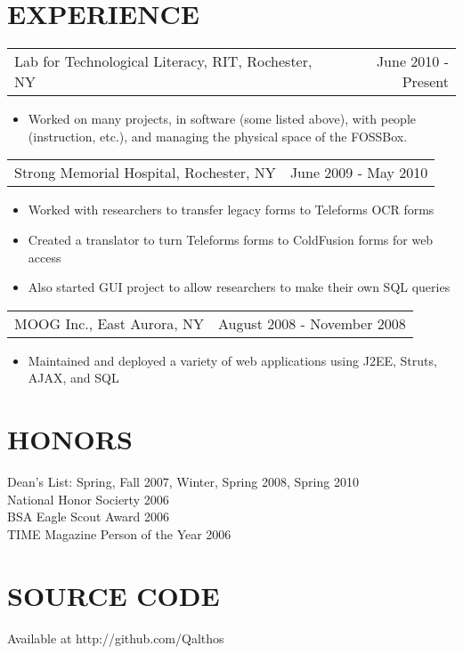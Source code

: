 \documentclass[line]{res}
\begin{document}
\begin{resume}
\section{EXPERIENCE}
    \begin{tabular}{p{3.5in} r} %
        Lab for Technological Literacy, RIT, Rochester, NY & June 2010 - Present
    \end{tabular}
        \begin{itemize} %
            \item[] Worked on many projects, in software (some listed above),
                with people (instruction, etc.), and managing the physical
                space of the FOSSBox.
        \end{itemize}
    \begin{tabular}{p{3.5in} r}
        Strong Memorial Hospital, Rochester, NY & June 2009 - May 2010
    \end{tabular}
    \begin{itemize}
        \item[] Worked with researchers to transfer legacy forms to Teleforms OCR forms
        \item[] Created a translator to turn Teleforms forms to ColdFusion forms for web access
        \item[] Also started GUI project to allow researchers to make their own SQL queries
    \end{itemize}
    \begin{tabular}{p{3.5in} r} %
        MOOG Inc., East Aurora, NY & August 2008 - November 2008
    \end{tabular}
    \begin{itemize}
        \item[] Maintained and deployed a variety of web applications using J2EE, Struts, AJAX, and SQL
    \end{itemize}

\section{HONORS} Dean's List: Spring, Fall 2007, Winter, Spring 2008, Spring 2010 \\
                 National Honor Socierty 2006 \\
                 BSA Eagle Scout Award 2006 \\
                 TIME Magazine Person of the Year 2006 \\

\section{SOURCE CODE} Available at http://github.com/Qalthos \\

\end{resume}
\end{document}

